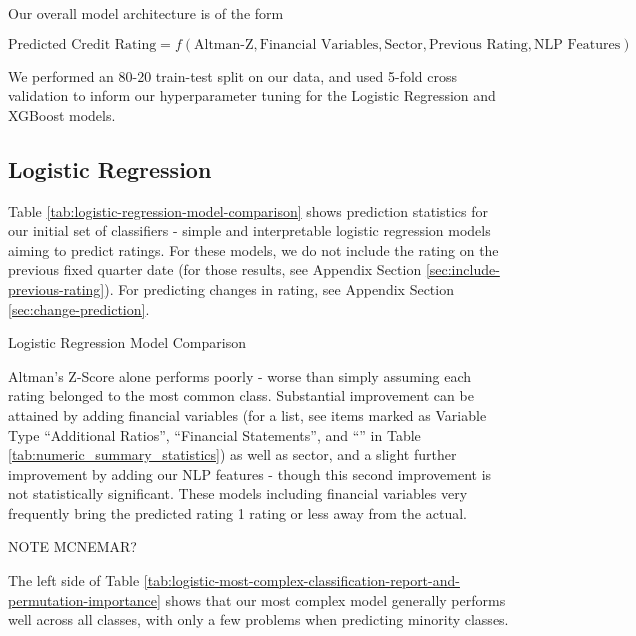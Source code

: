 \documentclass{article}[11pt]
\begin{document}
    Our overall model architecture is of the form

    \begin{equation*}
        \text{Predicted Credit Rating} = f(\text{Altman-Z}, \text{Financial Variables}, \text{Sector}, \text{Previous Rating}, \text{NLP Features})
    \end{equation*}

    We performed an 80-20 train-test split on our data, and used 5-fold cross validation to inform our hyperparameter tuning for the Logistic Regression and XGBoost models.

    \subsection*{Logistic Regression}

    Table \ref{tab:logistic-regression-model-comparison} shows prediction statistics for our initial set of classifiers - simple and interpretable logistic regression models aiming to predict ratings. For these models, we do not include the rating on the previous fixed quarter date (for those results, see Appendix Section \ref{sec:include-previous-rating}). For predicting changes in rating, see Appendix Section \ref{sec:change-prediction}.
    
    \begin{table}[h!]
        \centering
        \caption{Logistic Regression Model Comparison}
        
        \label{tab:logistic-regression-model-comparison}
    \end{table}

    Altman's Z-Score alone performs poorly - worse than simply assuming each rating belonged to the most common class. Substantial improvement can be attained by adding financial variables (for a list, see items marked as Variable Type ``Additional Ratios'', ``Financial Statements'', and ``'' in Table \ref{tab:numeric_summary_statistics}) as well as sector, and a slight further improvement by adding our NLP features - though this second improvement is not statistically significant. These models including financial variables very frequently bring the predicted rating 1 rating or less away from the actual.

    NOTE MCNEMAR?

    The left side of Table \ref{tab:logistic-most-complex-classification-report-and-permutation-importance} shows that our most complex model generally performs well across all classes, with only a few problems when predicting minority classes. %
    
\end{document}
